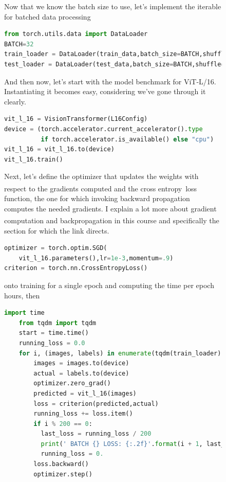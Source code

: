 \documentclass[12pt]{article}
\newcommand{\sidecite}[1]{\textsuperscript{\textcolor{blue}{\textbf{\scriptsize#1}}}}
\newcommand{\maincitecount}{\sidecite{\stepcounter{maincite}\themaincite}}
\begin{document}
\begin{figure}[!htb]
    \begin{minipage}[t]{0.65\textwidth}
    \raggedright
    Now that we know the batch size to use, let's implement the iterable for batched data 
    processing 
\begin{lstlisting}[language=python,style=python,basicstyle=\ttfamily\scriptsize]
from torch.utils.data import DataLoader
BATCH=32
train_loader = DataLoader(train_data,batch_size=BATCH,shuffle=True)
test_loader = DataLoader(test_data,batch_size=BATCH,shuffle=True)
\end{lstlisting}
And then now, let's start with the model benchmark for {ViT-L/16}. Instantiating it becomes 
easy, considering we've gone through it clearly.
\begin{lstlisting}[language=python,style=python,basicstyle=\ttfamily\scriptsize]
vit_l_16 = VisionTransformer(L16Config)
device = (torch.accelerator.current_accelerator().type 
          if torch.accelerator.is_available() else "cpu")
vit_l_16 = vit_l_16.to(device)
vit_l_16.train()
\end{lstlisting}
Next, let's define the optimizer that updates the weights with respect to the gradients computed and 
the cross entropy\maincitecount\ loss function, the one for which invoking backward propagation 
computes the needed gradients. I explain a lot more about gradient computation and backpropagation in 
this course \maincitecount and specifically the section for which the link directs. 
\begin{lstlisting}[language=python,style=python,basicstyle=\ttfamily\scriptsize]
optimizer = torch.optim.SGD(
    vit_l_16.parameters(),lr=1e-3,momentum=.9)
criterion = torch.nn.CrossEntropyLoss()    
\end{lstlisting}
onto training for a single epoch and computing the time per epoch hours, then
\begin{lstlisting}[language=python,style=python,basicstyle=\ttfamily\scriptsize]
    import time
    from tqdm import tqdm 
    start = time.time()
    running_loss = 0.0
    for i, (images, labels) in enumerate(tqdm(train_loader)):
        images = images.to(device)
        actual = labels.to(device)
        optimizer.zero_grad()
        predicted = vit_l_16(images)
        loss = criterion(predicted,actual)
        running_loss += loss.item()
        if i % 200 == 0:
          last_loss = running_loss / 200
          print(' BATCH {} LOSS: {:.2f}'.format(i + 1, last_loss))
          running_loss = 0.
        loss.backward()
        optimizer.step()

\end{lstlisting}
\end{minipage}
\end{figure}
\end{document}

